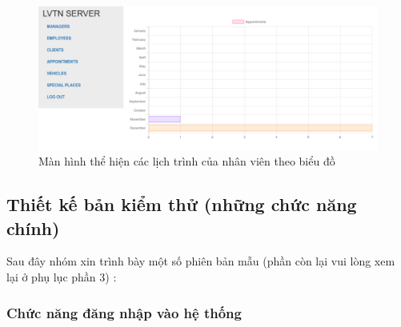 \documentclass[a4paper]{article}
\begin{document}
\begin{figure}[H]
\centering
\includegraphics[scale=0.5]{admin/admin_lichtrinhchart}
\caption{Màn hình thể hiện các lịch trình của nhân viên theo biểu đồ}
\end{figure}
\subsection{Thiết kế bản kiểm thử (những chức năng chính)}
Sau đây nhóm xin trình bày một số phiên bản mẫu (phần còn lại vui lòng xem lại ở phụ lục phần 3) : 
\subsubsection {Chức năng đăng nhập vào hệ thống}
\end{document}
